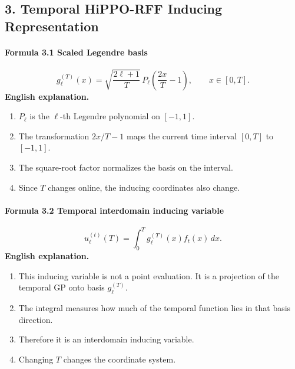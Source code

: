 \documentclass[12pt]{article}
\begin{document}
\subsection{3. Temporal HiPPO-RFF Inducing Representation}
\paragraph{Formula 3.1 Scaled Legendre basis}
\[
g_\ell^{(T)}(x)=\sqrt{\frac{2\ell+1}{T}}\,P_\ell\!\left(\frac{2x}{T}-1\right),
\qquad x\in[0,T].
\]
\textbf{English explanation.}
\begin{enumerate}[leftmargin=2em]
\item \(P_\ell\) is the \(\ell\)-th Legendre polynomial on \([-1,1]\).
\item The transformation \(2x/T-1\) maps the current time interval \([0,T]\) to \([-1,1]\).
\item The square-root factor normalizes the basis on the interval.
\item Since \(T\) changes online, the inducing coordinates also change.
\end{enumerate}

\paragraph{Formula 3.2 Temporal interdomain inducing variable}
\[
u_\ell^{(t)}(T)=\int_0^T g_\ell^{(T)}(x)f_t(x)\,dx.
\]
\textbf{English explanation.}
\begin{enumerate}[leftmargin=2em]
\item This inducing variable is not a point evaluation. It is a projection of the temporal GP onto basis \(g_\ell^{(T)}\).
\item The integral measures how much of the temporal function lies in that basis direction.
\item Therefore it is an interdomain inducing variable.
\item Changing \(T\) changes the coordinate system.
\end{enumerate}
\end{document}
